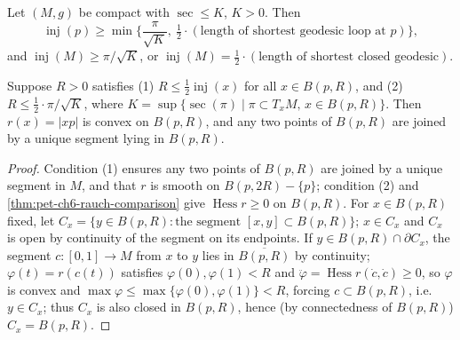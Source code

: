 \begin{lemma}
  \label{lem:pet-ch6-klingenberg-injectivity-estimate}
  Let $(M,g)$ be compact with $\sec\le K$, $K>0$. Then
  \[
    \operatorname{inj}(p)\ge\min\Big\{\frac{\pi}{\sqrt K},\ \tfrac12\cdot
    (\text{length of shortest geodesic loop at }p)\Big\},
  \]
  and $\operatorname{inj}(M)\ge\pi/\sqrt K$, or
  $\operatorname{inj}(M)=\tfrac12\cdot(\text{length of shortest closed geodesic})$.
\end{lemma}

\begin{theorem}[Theorem 6.4.8]
  \label{thm:pet-ch6-convexity-radius-criterion}
  Suppose $R>0$ satisfies (1) $R\le\tfrac12\operatorname{inj}(x)$ for all $x\in B(p,R)$,
  and (2) $R\le\tfrac12\cdot\pi/\sqrt K$, where
  $K=\sup\{\sec(\pi)\mid\pi\subset T_xM,\,x\in B(p,R)\}$. Then $r(x)=|xp|$ is
  convex on $B(p,R)$, and any two points of $B(p,R)$ are joined by a unique
  segment lying in $B(p,R)$.
\end{theorem}
\begin{proof}
  Condition (1) ensures any two points of $B(p,R)$ are joined by a unique
  segment in $M$, and that $r$ is smooth on $B(p,2R)-\{p\}$; condition (2)
  and \cref{thm:pet-ch6-rauch-comparison} give $\operatorname{Hess}r\ge0$ on $B(p,R)$.
  For $x\in B(p,R)$ fixed, let $C_x=\{y\in B(p,R):\text{the segment
  }[x,y]\subset B(p,R)\}$; $x\in C_x$ and $C_x$ is open by continuity of the
  segment on its endpoints. If $y\in B(p,R)\cap\partial C_x$, the segment
  $c:[0,1]\to M$ from $x$ to $y$ lies in $\overline{B(p,R)}$ by continuity;
  $\varphi(t)=r(c(t))$ satisfies $\varphi(0),\varphi(1)<R$ and
  $\ddot\varphi=\operatorname{Hess}r(\dot c,\dot c)\ge0$, so $\varphi$ is convex and
  $\max\varphi\le\max\{\varphi(0),\varphi(1)\}<R$, forcing $c\subset B(p,R)$,
  i.e.\ $y\in C_x$; thus $C_x$ is also closed in $B(p,R)$, hence (by
  connectedness of $B(p,R)$) $C_x=B(p,R)$.
\end{proof}

